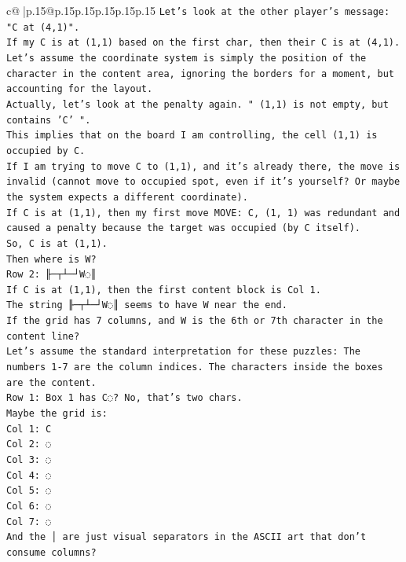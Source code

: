 \documentclass{article}
\begin{document}
{\begin{supertabular}{c@{$\;$}|p{.15\linewidth}@{}p{.15\linewidth}p{.15\linewidth}p{.15\linewidth}p{.15\linewidth}p{.15\linewidth}}
{{{\texttt{Let's look at the other player's message: "C at (4,1)".} \\
\texttt{If my C is at (1,1) based on the first char, then their C is at (4,1).} \\
\texttt{Let's assume the coordinate system is simply the position of the character in the content area, ignoring the borders for a moment, but accounting for the layout.} \\
\texttt{Actually, let's look at the penalty again. " (1,1) is not empty, but contains 'C' ".} \\
\texttt{This implies that on the board I am controlling, the cell (1,1) is occupied by C.} \\
\texttt{If I am trying to move C to (1,1), and it's already there, the move is invalid (cannot move to occupied spot, even if it's yourself? Or maybe the system expects a different coordinate).} \\
\texttt{If C is at (1,1), then my first move MOVE: C, (1, 1) was redundant and caused a penalty because the target was occupied (by C itself).} \\
\texttt{So, C is at (1,1).} \\
\texttt{Then where is W?} \\
\texttt{Row 2: ╟─┬┴─┘W◌║} \\
\texttt{If C is at (1,1), then the first content block is Col 1.} \\
\texttt{The string ╟─┬┴─┘W◌║ seems to have W near the end.} \\
\texttt{If the grid has 7 columns, and W is the 6th or 7th character in the content line?} \\
\texttt{Let's assume the standard interpretation for these puzzles: The numbers 1{-}7 are the column indices. The characters inside the boxes are the content.} \\
\texttt{Row 1: Box 1 has C◌? No, that's two chars.} \\
\texttt{Maybe the grid is:} \\
\texttt{Col 1: C} \\
\texttt{Col 2: ◌} \\
\texttt{Col 3: ◌} \\
\texttt{Col 4: ◌} \\
\texttt{Col 5: ◌} \\
\texttt{Col 6: ◌} \\
\texttt{Col 7: ◌} \\
\texttt{And the │ are just visual separators in the ASCII art that don't consume columns?} \\
}}}
\end{supertabular}}
\end{document}
